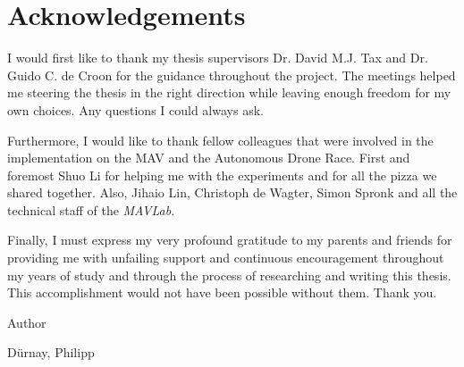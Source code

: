 \chapter{Acknowledgements}

I would first like to thank my thesis supervisors Dr. David M.J. Tax and Dr. Guido C. de Croon for the guidance throughout the project. The meetings helped me steering the thesis in the right direction while leaving enough freedom for my own choices. Any questions I could always ask.

Furthermore, I would like to thank fellow colleagues that were involved in the implementation on the \ac{MAV} and the Autonomous Drone Race. First and foremost Shuo Li for helping me with the experiments and for all the pizza we shared together. Also, Jihaio Lin, Christoph de Wagter, Simon Spronk and all the technical staff of the \textit{MAVLab}. 
 
Finally, I must express my very profound gratitude to my parents and friends for providing me with unfailing support and continuous encouragement throughout my years of study and through the process of researching and writing this thesis. This accomplishment would not have been possible without them. Thank you.

Author

Dürnay, Philipp